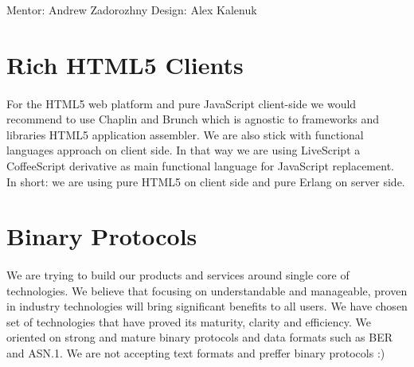 \documentclass[11pt]{article}
\begin{document}

Mentor: Andrew Zadorozhny \@br Design: Alex Kalenuk


\section*{Rich HTML5 Clients}
\paragraph{}
    For the HTML5 web platform and pure JavaScript client-side we would recommend to use
    Chaplin and Brunch which is agnostic to frameworks and libraries HTML5 application assembler.
    We are also stick with functional languages approach on client side.
    In that way we are using LiveScript a CoffeeScript derivative as main functional language for JavaScript replacement.
    In short: we are using pure HTML5 on client side and pure Erlang on server side.


\section*{Binary Protocols}
\paragraph{}
    We are trying to build our products
    and services around single core of technologies. We believe that focusing on understandable
    and manageable, proven in industry technologies will bring significant benefits to all users.
    We have chosen set of technologies that have proved its maturity, clarity and efficiency.
    We oriented on strong and mature binary protocols and data formats such as BER and ASN.1.
    We are not accepting text formats and preffer binary protocols :)




\end{document}
